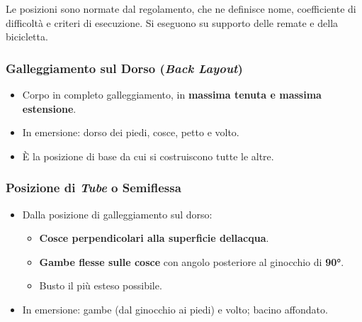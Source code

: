 \documentclass[a4paper,11pt]{article}
\providecommand{\tightlist}{%
  \setlength{\itemsep}{0pt}\setlength{\parskip}{0pt}}
\begin{document}
Le posizioni sono normate dal regolamento, che ne definisce nome,
coefficiente di difficoltà e criteri di esecuzione. Si eseguono su
supporto delle remate e della bicicletta.

\subsubsection{\texorpdfstring{Galleggiamento sul Dorso (\emph{Back
                  Layout})}{Galleggiamento sul Dorso (Back Layout)}}\label{galleggiamento-sul-dorso-back-layout}

\begin{itemize}
      \tightlist
      \item
            Corpo in completo galleggiamento, in \textbf{massima tenuta e massima
                  estensione}.
      \item
            In emersione: dorso dei piedi, cosce, petto e volto.
      \item
            È la posizione di base da cui si costruiscono tutte le altre.
\end{itemize}

\subsubsection{\texorpdfstring{Posizione di \emph{Tube} o
            Semiflessa}{Posizione di Tube o Semiflessa}}\label{posizione-di-tube-o-semiflessa}

\begin{itemize}
      \tightlist
      \item
            Dalla posizione di galleggiamento sul dorso:

            \begin{itemize}
                  \tightlist
                  \item
                        \textbf{Cosce perpendicolari alla superficie
                              dell\textquotesingle acqua}.
                  \item
                        \textbf{Gambe flesse sulle cosce} con angolo posteriore al ginocchio
                        di \textbf{90°}.
                  \item
                        Busto il più esteso possibile.
            \end{itemize}
      \item
            In emersione: gambe (dal ginocchio ai piedi) e volto; bacino
            affondato.
\end{itemize}
\end{document}
